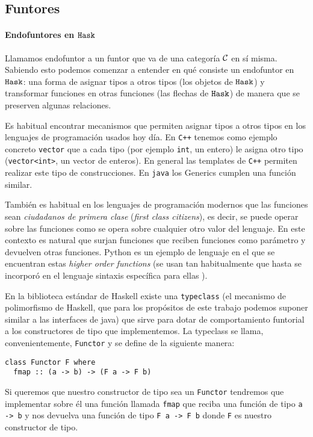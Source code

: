 \subsection{Funtores}
\paragraph{Endofuntores en $\texttt{Hask}$}
Llamamos endofuntor a un funtor que va de una categoría $\mathcal{C}$ en sí misma.
Sabiendo esto podemos comenzar a entender en qué consiste un endofuntor
en $\texttt{Hask}$: una forma de asignar tipos a otros tipos (los objetos
de $\texttt{Hask}$) y transformar funciones en otras funciones (las flechas
de $\texttt{Hask}$) de manera que se preserven algunas relaciones.

Es habitual encontrar mecanismos que permiten asignar tipos a otros tipos
en los lenguajes de programación usados hoy día. En \verb~C++~
tenemos como ejemplo concreto \verb~vector~ que a cada tipo
(por ejemplo \verb~int~, un entero)
le asigna otro tipo (\verb~vector<int>~, un vector de enteros). En
general las templates de \texttt{C++} permiten realizar este tipo de
construcciones. En \verb~java~ los Generics cumplen una función similar.

También es habitual en los lenguajes de programación modernos
que las funciones
sean \textit{ciudadanos de primera clase} (\textit{first class citizens}),
es decir, se puede operar sobre las funciones como se opera sobre
cualquier otro valor del lenguaje. En este contexto es natural que
surjan funciones que reciben funciones como parámetro y devuelven
otras funciones. Python es un ejemplo de lenguaje en el que
se encuentran estas \textit{higher order functions} (se usan
tan habitualmente que hasta se incorporó en el
lenguaje sintaxis específica para ellas \cite{decorators}).

En la biblioteca estándar de Haskell existe una \verb~typeclass~
(el mecanismo de polimorfismo de Haskell, que para los propósitos
de este trabajo podemos suponer similar a las interfaces de java)
que sirve para dotar de comportamiento funtorial a los constructores
de tipo que implementemos. La typeclass
se llama, convenientemente, \verb~Functor~ \cite{haskell-functor} y se
define de la siguiente manera:

\begin{verbatim}
class Functor F where
  fmap :: (a -> b) -> (F a -> F b)
\end{verbatim}

Si queremos que nuestro constructor de tipo
sea un \verb~Functor~ tendremos
que implementar sobre él una función llamada \verb~fmap~ que reciba
una función de tipo \verb~a -> b~ y nos devuelva una función
de tipo \verb~F a -> F b~ donde \verb~F~ es nuestro constructor de tipo.

